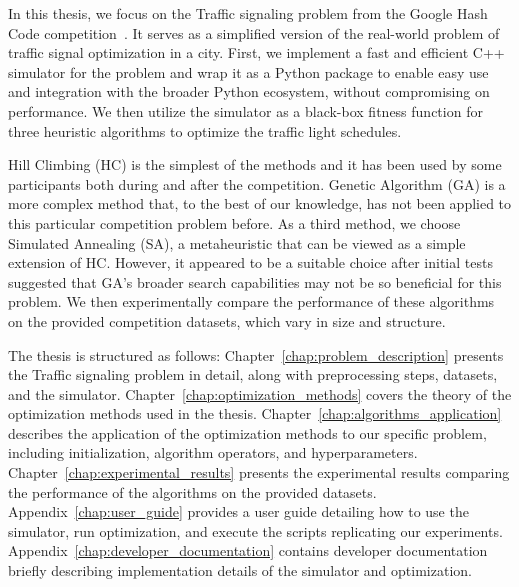 In this thesis, we focus on the Traffic signaling problem from the Google Hash Code competition~\cite{google2023google}. It serves as a simplified version of the real-world problem of traffic signal optimization in a city. First, we implement a fast and efficient C++ simulator for the problem and wrap it as a Python package to enable easy use and integration with the broader Python ecosystem, without compromising on performance.
We then utilize the simulator as a black-box fitness function for three heuristic algorithms to optimize the traffic light schedules.

Hill Climbing (HC) is the simplest of the methods and it has been used by some participants both during and after the competition.
Genetic Algorithm (GA) is a more complex method that, to the best of our knowledge, has not been applied to this particular competition problem before.
As a third method, we choose Simulated Annealing (SA), a metaheuristic that can be viewed as a simple extension of HC. However, it appeared to be a suitable choice after initial tests suggested that GA's broader search capabilities may not be so beneficial for this problem.
We then experimentally compare the performance of these algorithms on the provided competition datasets, which vary in size and structure.

The thesis is structured as follows:
Chapter~\ref{chap:problem_description} presents the Traffic signaling problem in detail, along with preprocessing steps, datasets, and the simulator.
Chapter~\ref{chap:optimization_methods} covers the theory of the optimization methods used in the thesis.
Chapter~\ref{chap:algorithms_application} describes the application of the optimization methods to our specific problem, including initialization, algorithm operators, and hyperparameters.
Chapter~\ref{chap:experimental_results} presents the experimental results comparing the performance of the algorithms on the provided datasets.
Appendix~\ref{chap:user_guide} provides a user guide detailing how to use the simulator, run optimization, and execute the scripts replicating our experiments.
Appendix~\ref{chap:developer_documentation} contains developer documentation briefly describing implementation details of the simulator and optimization.
